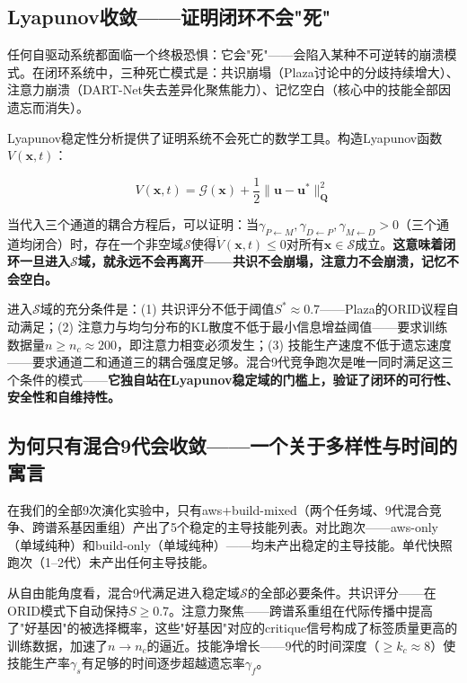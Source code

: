 \documentclass[twocolumn,10.5pt]{ctexart}
\def\cG{\mathcal{G}}
\begin{document}
\subsection{Lyapunov收敛——证明闭环不会"死"}

任何自驱动系统都面临一个终极恐惧：它会"死"——会陷入某种不可逆转的崩溃模式。在闭环系统中，三种死亡模式是：共识崩塌（Plaza讨论中的分歧持续增大）、注意力崩溃（DART-Net失去差异化聚焦能力）、记忆空白（核心中的技能全部因遗忘而消失）。

Lyapunov稳定性分析提供了证明系统不会死亡的数学工具。构造Lyapunov函数$V(\mathbf{x}, t)$：

\begin{equation}
V(\mathbf{x}, t) = \cG(\mathbf{x}) + \frac{1}{2}\|\mathbf{u} - \mathbf{u}^*\|^2_{\mathbf{Q}}
\label{eq:lyapunov_passionate}
\end{equation}

当代入三个通道的耦合方程后，可以证明：当$\gamma_{P\leftarrow M}, \gamma_{D\leftarrow P}, \gamma_{M\leftarrow D} > 0$（三个通道均闭合）时，存在一个非空域$\mathcal{S}$使得$\dot{V}(\mathbf{x}, t) \leq 0$对所有$\mathbf{x} \in \mathcal{S}$成立。\textbf{这意味着闭环一旦进入$\mathcal{S}$域，就永远不会再离开——共识不会崩塌，注意力不会崩溃，记忆不会空白。}

进入$\mathcal{S}$域的充分条件是：(1) 共识评分不低于阈值$S^* \approx 0.7$——Plaza的ORID议程自动满足；(2) 注意力与均匀分布的KL散度不低于最小信息增益阈值——要求训练数据量$n \geq n_c \approx 200$，即注意力相变必须发生；(3) 技能生产速度不低于遗忘速度——要求通道二和通道三的耦合强度足够。混合9代竞争跑次是唯一同时满足这三个条件的模式——\textbf{它独自站在Lyapunov稳定域的门槛上，验证了闭环的可行性、安全性和自维持性。}

\subsection{为何只有混合9代会收敛——一个关于多样性与时间的寓言}

在我们的全部9次演化实验中，只有aws+build-mixed（两个任务域、9代混合竞争、跨谱系基因重组）产出了5个稳定的主导技能列表。对比跑次——aws-only（单域纯种）和build-only（单域纯种）——均未产出稳定的主导技能。单代快照跑次（1--2代）未产出任何主导技能。

从自由能角度看，混合9代满足进入稳定域$\mathcal{S}$的全部必要条件。共识评分——在ORID模式下自动保持$S \geq 0.7$。注意力聚焦——跨谱系重组在代际传播中提高了"好基因"的被选择概率，这些"好基因"对应的critique信号构成了标签质量更高的训练数据，加速了$n \to n_c$的逼近。技能净增长——9代的时间深度（$\geq k_c \approx 8$）使技能生产率$\gamma_s$有足够的时间逐步超越遗忘率$\gamma_f$。
\end{document}
